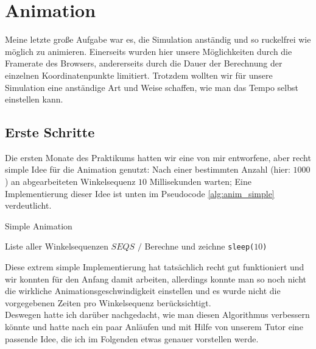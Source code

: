 \section{Animation}
\label{sec:animation}
Meine letzte große Aufgabe war es, die Simulation anständig und so ruckelfrei wie möglich zu animieren. Einerseits wurden hier unsere Möglichkeiten durch die Framerate des Browsers, andererseits durch die Dauer der Berechnung der einzelnen Koordinatenpunkte limitiert. Trotzdem wollten wir für unsere Simulation eine anständige Art und Weise schaffen, wie man das Tempo selbst einstellen kann.

\subsection{Erste Schritte}
Die ersten Monate des Praktikums hatten wir eine von mir entworfene, aber recht simple Idee für die Animation genutzt: Nach einer bestimmten Anzahl (hier: $1000$) an abgearbeiteten Winkelsequenz $10$ Millisekunden warten; Eine Implementierung dieser Idee ist unten im Pseudocode \ref{alg:anim_simple} verdeutlicht. 

\begin{algorithm}[H]
\caption{Simple Animation}\label{alg:anim_simple}
\begin{algorithmic}[1]
\Require Liste aller Winkelsequenzen $SEQS$
\Ensure $/$
        \State Berechne und zeichne 
        	\State \texttt{sleep($10$)}  
        \EndIf
    \EndFor
\EndWhile
\end{algorithmic}
\end{algorithm}

Diese extrem simple Implementierung hat tatsächlich recht gut funktioniert und wir konnten für den Anfang damit arbeiten, allerdings konnte man so noch nicht die wirkliche Animationsgeschwindigkeit einstellen und es wurde nicht die vorgegebenen Zeiten pro Winkelsequenz berücksichtigt. \\
Deswegen hatte ich darüber nachgedacht, wie man diesen Algorithmus verbessern könnte und hatte nach ein paar Anläufen und mit Hilfe von unserem Tutor eine passende Idee, die ich im Folgenden etwas genauer vorstellen werde. \\

    
